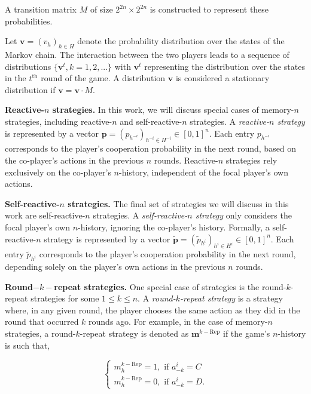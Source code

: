 \documentclass{article}
\theoremstyle{definition}
\begin{document}
A transition matrix \(M\) of size \(2^{2n} \times 2^{2n}\) is constructed to
represent these probabilities.

Let \(\mathbf{v} = (v_h)_{h\in H}\) denote the probability distribution over the
states of the Markov chain. The interaction between the two players leads to a
sequence of distributions \(\{\mathbf{v}^{t}, k = 1, 2, ...\}\) with
\(\mathbf{v}^{t}\) representing the distribution over the states in the
\(t^{\text{th}}\) round of the game. A distribution \(\mathbf{v}\) is considered
a stationary distribution if \(\mathbf{v} = \mathbf{v} \cdot M\).

{\bf Reactive-$n$ strategies.}
In this work, we will discuss special cases of memory-$n$ strategies,
including reactive-$n$ and self-reactive-$n$ strategies. A {\it reactive-$n$
strategy} is represented by a vector $\mathbf{p}=(p_{h^{-i}})_{h^{-i}\in H^{-i}}
\in [0, 1]^{n}$. Each entry $p_{h^{-i}}$ corresponds to the player's cooperation
probability in the next round, based on the co-player's actions in the previous
$n$ rounds. Reactive-$n$ strategies rely exclusively on the co-player's
$n$-history, independent of the focal player's own actions.

{\bf Self-reactive-$n$ strategies.}
The final set of strategies we will discuss
in this work are self-reactive-$n$ strategies. A {\it self-reactive-$n$ strategy}
only considers the focal player's own $n$-history, ignoring the co-player's
history. Formally, a self-reactive-$n$ strategy is represented by a vector
$\mathbf{\tilde{p}} = (\tilde{p}_{h^{i}})_{h^{i} \in H^i} \in [0, 1] ^ {n}$.
Each entry $\tilde{p}_{h^{i}}$ corresponds to the player's cooperation
probability in the next round, depending solely on the player's own actions in
the previous $n$ rounds.

{\bf Round$-k-$repeat strategies.}
One special case of strategies is the round-$k$-repeat strategies for some $1\le
k\le n$. A {\it round-$k$-repeat strategy} is a strategy where, in any given round,
the player chooses the same action as they did in the round that occurred $k$
rounds ago. For example, in the case of memory-$n$ strategies, a
round-$k$-repeat strategy is denoted as $\mathbf{m}^{k-\text{Rep}}$ if the
game's $n$-history is such that,

$$
\begin{cases}
  m^{k-\text{Rep}}_h\!=\!1, \text{ if } a^i_{-k}\!=\!C\\[1em]
  m^{k-\text{Rep}}_h\!=\!0, \text{ if } a^i_{-k}\!=\!D.
\end{cases}
$$
\end{document}
